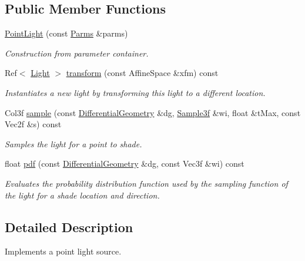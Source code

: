 \subsection*{Public Member Functions}
\begin{DoxyCompactItemize}
\item 
\hyperlink{classembree_1_1_point_light_a6383ddeeee65820669675b9cb77b9e28}{PointLight} (const \hyperlink{classembree_1_1_parms}{Parms} \&parms)
\begin{DoxyCompactList}\small\item\em Construction from parameter container. \item\end{DoxyCompactList}\item 
Ref$<$ \hyperlink{classembree_1_1_light}{Light} $>$ \hyperlink{classembree_1_1_point_light_a819014dd76584e8d695ef39834ce7446}{transform} (const AffineSpace \&xfm) const 
\begin{DoxyCompactList}\small\item\em Instantiates a new light by transforming this light to a different location. \item\end{DoxyCompactList}\item 
Col3f \hyperlink{classembree_1_1_point_light_a1ef13f8d67a82292933199775f37c5b1}{sample} (const \hyperlink{structembree_1_1_differential_geometry}{DifferentialGeometry} \&dg, \hyperlink{structembree_1_1_sample}{Sample3f} \&wi, float \&tMax, const Vec2f \&s) const 
\begin{DoxyCompactList}\small\item\em Samples the light for a point to shade. \item\end{DoxyCompactList}\item 
float \hyperlink{classembree_1_1_point_light_a9625baf678c9d70005f256b9e8839f6e}{pdf} (const \hyperlink{structembree_1_1_differential_geometry}{DifferentialGeometry} \&dg, const Vec3f \&wi) const 
\begin{DoxyCompactList}\small\item\em Evaluates the probability distribution function used by the sampling function of the light for a shade location and direction. \item\end{DoxyCompactList}\end{DoxyCompactItemize}


\subsection{Detailed Description}
Implements a point light source. 

